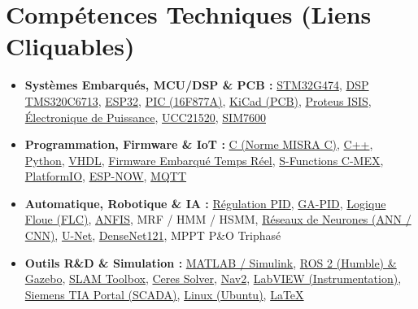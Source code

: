 \documentclass[10pt,a4paper]{article}
\begin{document}
\section*{Comp\'etences Techniques (Liens Cliquables)}
\begin{itemize}
\item \textbf{Systèmes Embarqués, MCU/DSP \& PCB :} \href{https://www.st.com/en/microcontrollers-microprocessors/stm32g474re.html}{STM32G474}, \href{https://www.ti.com/product/TMS320C6713B}{DSP TMS320C6713}, \href{https://www.espressif.com/en/products/socs/esp32}{ESP32}, \href{https://www.microchip.com/en-us/product/PIC16F877A}{PIC (16F877A)}, \href{https://www.kicad.org/}{KiCad (PCB)}, \href{https://www.labcenter.com/}{Proteus ISIS}, \href{https://fr.mathworks.com/solutions/power-electronics-control.html}{Électronique de Puissance}, \href{https://www.ti.com/product/UCC21520}{UCC21520}, \href{https://www.simcom.com/product/SIM7600X-H.html}{SIM7600}
\item \textbf{Programmation, Firmware \& IoT :} \href{https://misra.org.uk/}{C (Norme MISRA C)}, \href{https://isocpp.org/}{C++}, \href{https://www.python.org/}{Python}, \href{https://standards.ieee.org/ieee/1076/6769/}{VHDL}, \href{https://www.freertos.org/}{Firmware Embarqué Temps Réel}, \href{https://fr.mathworks.com/help/simulink/sfg/what-is-an-s-function.html}{S-Functions C-MEX}, \href{https://platformio.org/}{PlatformIO}, \href{https://www.espressif.com/en/solutions/low-power-solutions/esp-now}{ESP-NOW}, \href{https://mqtt.org/}{MQTT}
\item \textbf{Automatique, Robotique \& IA :} \href{https://fr.mathworks.com/discovery/pid-control.html}{Régulation PID}, \href{https://www.mathworks.com/discovery/genetic-algorithm.html}{GA-PID}, \href{https://fr.mathworks.com/products/fuzzy-logic.html}{Logique Floue (FLC)}, \href{https://www.mathworks.com/help/fuzzy/neuro-adaptive-learning-and-anfis.html}{ANFIS}, MRF / HMM / HSMM, \href{https://pytorch.org/}{Réseaux de Neurones (ANN / CNN)}, \href{https://arxiv.org/abs/1505.04597}{U-Net}, \href{https://arxiv.org/abs/1608.06993}{DenseNet121}, MPPT P\&O Triphasé
\item \textbf{Outils R\&D \& Simulation :} \href{https://fr.mathworks.com/products/simulink.html}{MATLAB / Simulink}, \href{https://docs.ros.org/en/humble/}{ROS 2 (Humble) \& Gazebo}, \href{https://github.com/SteveMacenski/slam_toolbox}{SLAM Toolbox}, \href{http://ceres-solver.org/}{Ceres Solver}, \href{https://navigation.ros.org/}{Nav2}, \href{https://www.ni.com/fr/shop/labview.html}{LabVIEW (Instrumentation)}, \href{https://www.siemens.com/global/en/products/automation/industry-software/automation-software/tia-portal.html}{Siemens TIA Portal (SCADA)}, \href{https://ubuntu.com/}{Linux (Ubuntu)}, \href{https://www.latex-project.org/}{LaTeX}
\end{itemize}
\end{document}
